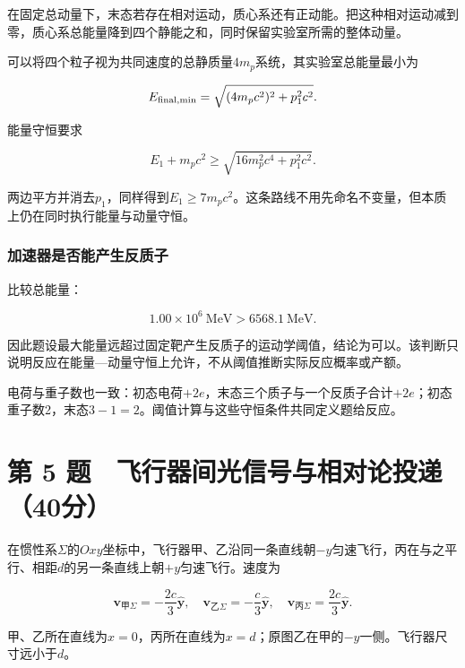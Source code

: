 \documentclass[12pt,a4paper,fontset=fandol]{ctexart}
\begin{document}
在固定总动量下，末态若存在相对运动，质心系还有正动能。把这种相对运动减到零，质心系总能量降到四个静能之和，同时保留实验室所需的整体动量。

可以将四个粒子视为共同速度的总静质量\(4m_p\)系统，其实验室总能量最小为

\[
E_{\rm final,min}
=\sqrt{(4m_pc^2)^2+p_1^2c^2}.
\]

能量守恒要求

\[
E_1+m_pc^2
\geq\sqrt{16m_p^2c^4+p_1^2c^2}.
\]

两边平方并消去\(p_1\)，同样得到\(E_1\geq7m_pc^2\)。这条路线不用先命名不变量，但本质上仍在同时执行能量与动量守恒。

\par\noindent\begin{minipage}{\linewidth}
\subsubsection{加速器是否能产生反质子}\label{ux52a0ux901fux5668ux662fux5426ux80fdux4ea7ux751fux53cdux8d28ux5b50}

比较总能量：

\[
1.00\times10^6\ \mathrm{MeV}
>6568.1\ \mathrm{MeV}.
\]

因此题设最大能量远超过固定靶产生反质子的运动学阈值，结论为可以。该判断只说明反应在能量---动量守恒上允许，不从阈值推断实际反应概率或产额。

电荷与重子数也一致：初态电荷\(+2e\)，末态三个质子与一个反质子合计\(+2e\)；初态重子数2，末态\(3-1=2\)。阈值计算与这些守恒条件共同定义题给反应。

\end{minipage}\par
\clearpage

\section{第 5
题　飞行器间光信号与相对论投递（40分）}\label{ux7b2c-5-ux9898-ux98deux884cux5668ux95f4ux5149ux4fe1ux53f7ux4e0eux76f8ux5bf9ux8bbaux6295ux901240ux5206}

在惯性系\(\Sigma\)的\(Oxy\)坐标中，飞行器甲、乙沿同一条直线朝\(-y\)匀速飞行，丙在与之平行、相距\(d\)的另一条直线上朝\(+y\)匀速飞行。速度为

\[
\mathbf v_{\text{甲}\Sigma}=-\frac{2c}{3}\hat{\mathbf y},
\quad
\mathbf v_{\text{乙}\Sigma}=-\frac c3\hat{\mathbf y},
\quad
\mathbf v_{\text{丙}\Sigma}=\frac{2c}{3}\hat{\mathbf y}.
\]

甲、乙所在直线为\(x=0\)，丙所在直线为\(x=d\)；原图乙在甲的\(-y\)一侧。飞行器尺寸远小于\(d\)。
\end{document}
